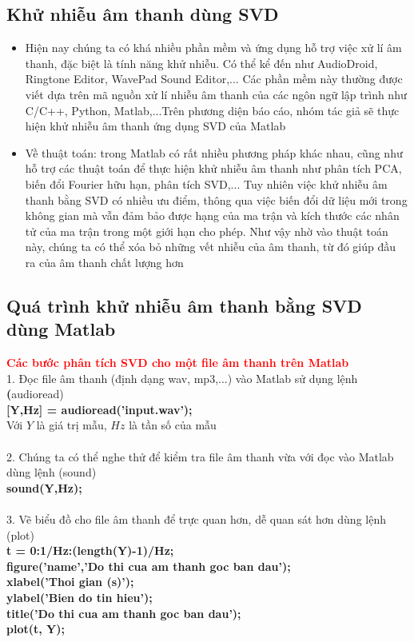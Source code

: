 \subsection{Khử nhiễu âm thanh dùng SVD}
\begin{itemize}
	\item Hiện nay chúng ta có khá nhiều phần mềm và ứng dụng hỗ trợ việc xử lí âm thanh, đặc biệt là tính năng khử nhiễu. Có thể kể đến như AudioDroid, Ringtone Editor, WavePad Sound Editor,... Các phần mềm này thường được viết dựa trên mã nguồn xử lí nhiễu âm thanh của các ngôn ngữ lập trình như C/C++, Python, Matlab,...Trên phương diện báo cáo, nhóm tác giả sẽ thực hiện khử nhiễu âm thanh ứng dụng SVD của Matlab
	\item Về thuật toán: trong Matlab có rất nhiều phương pháp khác nhau, cũng như hỗ trợ các thuật toán để thực hiện khử nhiễu âm thanh như phân tích PCA, biến đổi Fourier hữu hạn, phân tích SVD,... Tuy nhiên việc khử nhiễu âm thanh bằng SVD có nhiều ưu điểm, thông qua việc biến đổi dữ liệu mới trong không gian mà vẫn đảm bảo được hạng của ma trận và kích thước các nhân tử của ma trận trong một giới hạn cho phép. Như vậy nhờ vào thuật toán này, chúng ta có thể xóa bỏ những vết nhiễu của âm thanh, từ đó giúp đầu ra của âm thanh chất lượng hơn
\end{itemize}
\subsection{Quá trình khử nhiễu âm thanh bằng SVD dùng Matlab}
\textbf{\textcolor{red}{Các bước phân tích SVD cho một file âm thanh trên Matlab}}\\
1. Đọc file âm thanh (định dạng wav, mp3,...) vào Matlab sử dụng lệnh \textbf(audioread)\\
\textbf{[Y,Hz] = audioread('input.wav');} \\
Với $Y$ là giá trị mẫu, $Hz$ là tần số của mẫu\\
\\
2. Chúng ta có thể nghe thử để kiểm tra file âm thanh vừa với đọc vào Matlab dùng lệnh (sound)\\
\textbf{sound(Y,Hz);}\\
\\
3. Vẽ biểu đồ cho file âm thanh để trực quan hơn, dễ quan sát hơn dùng lệnh (plot)\\
\textbf{t = 0:1/Hz:(length(Y)-1)/Hz;\\
figure('name','Do thi cua am thanh goc ban dau');\\
xlabel('Thoi gian (s)');\\
ylabel('Bien do tin hieu');\\
title('Do thi cua am thanh goc ban dau');\\
plot(t, Y);
}\\
\\

